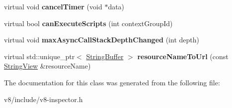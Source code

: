 \begin{DoxyCompactItemize}
virtual void {\bfseries cancel\+Timer} (void $\ast$data)
\item 
\mbox{\label{classv8__inspector_1_1V8InspectorClient_a889174cfb82aee1148e61b9fe3801605}} 
virtual bool {\bfseries can\+Execute\+Scripts} (int context\+Group\+Id)
\item 
\mbox{\label{classv8__inspector_1_1V8InspectorClient_afdb594d52d1a1dfc751f11dbcf2166bf}} 
virtual void {\bfseries max\+Async\+Call\+Stack\+Depth\+Changed} (int depth)
\item 
\mbox{\label{classv8__inspector_1_1V8InspectorClient_a7db967e0049f3935b83de0788d111497}} 
virtual std\+::unique\+\_\+ptr$<$ \mbox{\hyperlink{classv8__inspector_1_1StringBuffer}{String\+Buffer}} $>$ {\bfseries resource\+Name\+To\+Url} (const \mbox{\hyperlink{classv8__inspector_1_1StringView}{String\+View}} \&resource\+Name)
\end{DoxyCompactItemize}


The documentation for this class was generated from the following file\+:\begin{DoxyCompactItemize}
\item 
v8/include/v8-\/inspector.\+h\end{DoxyCompactItemize}
